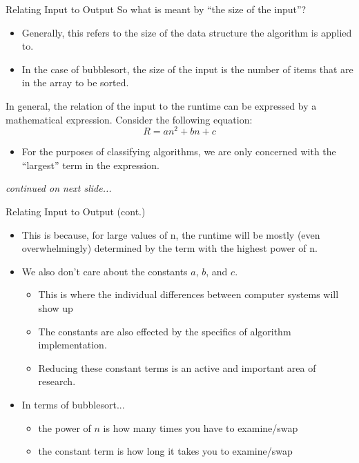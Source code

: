 \documentclass[11pt]{beamer}
\begin{document}
\begin{frame}{Relating Input to Output}
So what is meant by ``the size of the input''?
\begin{itemize}
\item Generally, this refers to the size of the data structure the algorithm is applied to.
\item In the case of bubblesort, the size of the input is the number of items that are in the array to be sorted.  
\end{itemize}
In general, the relation of the input to the runtime can be expressed by a mathematical expression. Consider the following equation:
$$ R = an^2 + bn + c $$
\begin{itemize}
\item For the purposes of classifying algorithms, we are only concerned with the ``largest'' term in the expression.  
\end{itemize}
\begin{flushright}
\emph{continued on next slide...}
\end{flushright}
\end{frame}

\begin{frame}{Relating Input to Output (cont.)}
\begin{itemize}
\item This is because, for large values of n, the runtime will be mostly (even overwhelmingly) determined by the term with the highest power of n.  
\item We also don't care about the constants $a$, $b$, and $c$.
\begin{itemize}
\item This is where the individual differences between computer systems will show up
\item The constants are also effected by the specifics of algorithm implementation.
\item Reducing these constant terms is an active and important area of research.
\end{itemize}
\item In terms of bubblesort...
\begin{itemize}
\item the power of $n$ is how many times you have to examine/swap
\item the constant term is how long it takes you to examine/swap
\end{itemize} 
\end{itemize}
\end{frame}
\end{document}
